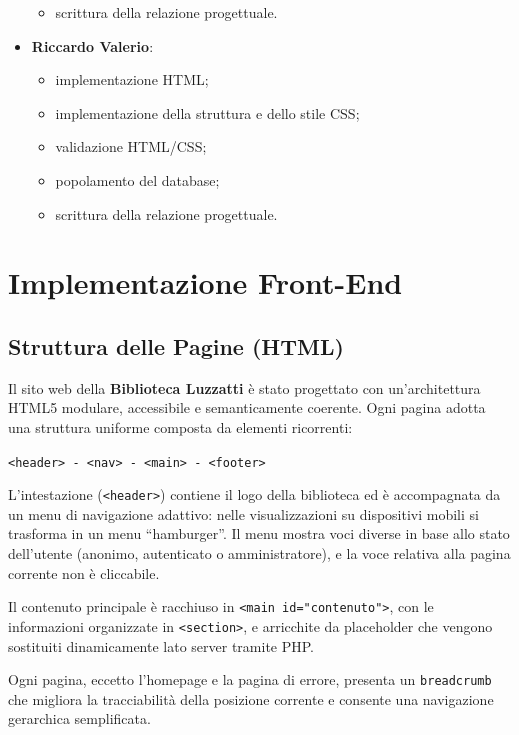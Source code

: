 \documentclass{article}
\begin{document}
\begin{itemize}
\begin{itemize}
                \item scrittura della relazione progettuale.
            \end{itemize}
   \item \textbf{Riccardo Valerio}:
            \begin{itemize}
                \item implementazione HTML;
                \item implementazione della struttura e dello stile CSS;
                \item validazione HTML/CSS;
                \item popolamento del database;
                \item scrittura della relazione progettuale.
            \end{itemize}
\end{itemize}


\newpage

\section{Implementazione Front-End}

\subsection{Struttura delle Pagine (HTML)}

Il sito web della \textbf{Biblioteca Luzzatti} è stato progettato con un'architettura HTML5 modulare, accessibile e semanticamente coerente. Ogni pagina adotta una struttura uniforme composta da elementi ricorrenti:

\begin{center}
\texttt{<header> - <nav> - <main> - <footer>}
\end{center}

L'intestazione (\texttt{<header>}) contiene il logo della biblioteca ed è accompagnata da un menu di navigazione adattivo: nelle visualizzazioni su dispositivi mobili si trasforma in un menu “hamburger”. Il menu mostra voci diverse in base allo stato dell’utente (anonimo, autenticato o amministratore), e la voce relativa alla pagina corrente non è cliccabile.

Il contenuto principale è racchiuso in \texttt{<main id="contenuto">}, con le informazioni organizzate in \texttt{<section>}, e arricchite da placeholder che vengono sostituiti dinamicamente lato server tramite PHP.

Ogni pagina, eccetto l’homepage e la pagina di errore, presenta un \texttt{breadcrumb} che migliora la tracciabilità della posizione corrente e consente una navigazione gerarchica semplificata.
\end{document}
